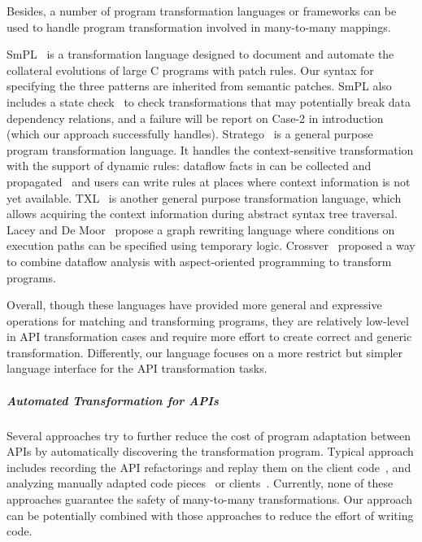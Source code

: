 \documentclass[a4paper, USenglish]{lipics-v2016}
\theoremstyle{plain}
\begin{document}
Besides, a number of program transformation languages or frameworks can be used to handle program transformation involved in many-to-many mappings. 

SmPL~\cite{DBLP:conf/eurosys/PadioleauLHM08} is a transformation language designed to document and
automate the collateral evolutions of large C programs with patch rules. Our syntax for
specifying the three patterns are inherited from semantic patches.
SmPL also includes a state check~\cite{DBLP:conf/popl/BrunelDHLM09} to check transformations that may potentially break data dependency
relations, and a failure will be report on
Case-2 in introduction (which our approach successfully handles).
Stratego~\cite{Bravenboer:2008:SLT:1385689.1385715}
is a general purpose program transformation language. It handles the
context-sensitive transformation with the support of dynamic rules: dataflow
facts in can be collected and propagated~\cite{Olmos:2005:CSD:2136624.2136643} and users can write rules at
places where context information is not yet available. TXL~\cite{Cordy:2006:TST:1149670.1149672} is another general purpose transformation language,  which allows acquiring the
context information during abstract syntax tree traversal. 
Lacey and De Moor~\cite{laceydemoor01} propose a graph rewriting language
where conditions on execution paths can be specified using temporary
logic. Crossver~\cite{sakurai2014crossver} proposed a way to combine dataflow
analysis with aspect-oriented programming to transform programs.

Overall, though these languages have provided more general and expressive operations
for matching and transforming programs, they are relatively low-level in API transformation cases
and require more effort to create correct and generic
transformation. Differently, our language focuses on a more restrict but simpler language interface for the API transformation tasks.

\subparagraph*{Automated Transformation for APIs}
Several approaches try to further reduce the cost of program adaptation between APIs by
automatically discovering the transformation program. Typical approach
includes recording the API refactorings and replay them on the client
code~\cite{Henkel:2005:CCR:1062455.1062512,DBLP:conf/icse/DigNMJ08},
and analyzing manually adapted code
pieces~\cite{Andersen:2012:SPI:2351676.2351753,%
  Nguyen:2010:GAA:1869459.1869486,Meng:2011:SEG:1993498.1993537}
or clients~\cite{Zhong:2010:MAM:1806799.1806831,DBLP:journals/jcst/WuLWM11}. Currently, none of
these approaches guarantee the safety of many-to-many
transformations. Our approach can be potentially combined with those approaches to reduce the effort of writing code.
\end{document}
